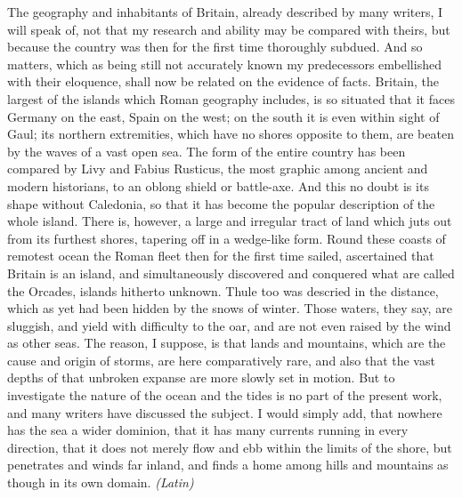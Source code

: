 The geography and inhabitants of Britain, already described by many writers, I will speak of, not that my research and ability may be compared with theirs, but because the country was then for the first time thoroughly subdued. And so matters, which as being still not accurately known my predecessors embellished with their eloquence, shall now be related on the evidence of facts. Britain, the largest of the islands which Roman geography includes, is so situated that it faces Germany on the east, Spain on the west; on the south it is even within sight of Gaul; its northern extremities, which have no shores opposite to them, are beaten by the waves of a vast open sea. The form of the entire country has been compared by Livy and Fabius Rusticus, the most graphic among ancient and modern historians, to an oblong shield or battle-axe. And this no doubt is its shape without Caledonia, so that it has become the popular description of the whole island. There is, however, a large and irregular tract of land which juts out from its furthest shores, tapering off in a wedge-like form. Round these coasts of remotest ocean the Roman fleet then for the first time sailed, ascertained that Britain is an island, and simultaneously discovered and conquered what are called the Orcades, islands hitherto unknown. Thule too was descried in the distance, which as yet had been hidden by the snows of winter. Those waters, they say, are sluggish, and yield with difficulty to the oar, and are not even raised by the wind as other seas. The reason, I suppose, is that lands and mountains, which are the cause and origin of storms, are here comparatively rare, and also that the vast depths of that unbroken expanse are more slowly set in motion. But to investigate the nature of the ocean and the tides is no part of the present work, and many writers have discussed the subject. I would simply add, that nowhere has the sea a wider dominion, that it has many currents running in every direction, that it does not merely flow and ebb within the limits of the shore, but penetrates and winds far inland, and finds a home among hills and mountains as though in its own domain. \emph{(Latin)}


